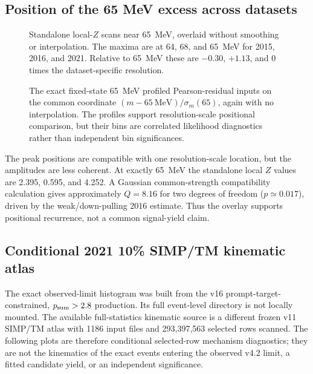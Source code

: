 \subsection{Position of the 65 MeV excess across datasets}
\label{app:m065-positional-overlay}

\begin{figure}[H]
\centering
{}
\caption{Standalone local-$Z$ scans near 65~MeV, overlaid without smoothing
or interpolation.  The maxima are at 64, 68, and 65~MeV for 2015, 2016, and
2021.  Relative to 65~MeV these are $-0.30$, $+1.13$, and $0$ times the
dataset-specific resolution.}
\label{fig:v4p2-m065-z-overlay}
\end{figure}

\begin{figure}[H]
\centering
{}
\caption{The exact fixed-state 65~MeV profiled Pearson-residual inputs on the
common coordinate $(m-65~\mathrm{MeV})/\sigma_m(65)$, again with no
interpolation.  The profiles support resolution-scale positional comparison,
but their bins are correlated likelihood diagnostics rather than independent
bin significances.}
\label{fig:v4p2-m065-residual-overlay}
\end{figure}

The peak positions are compatible with one resolution-scale location, but
the amplitudes are less coherent.  At exactly 65~MeV the standalone local
$Z$ values are 2.395, 0.595, and 4.252.  A Gaussian common-strength
compatibility calculation gives approximately $Q=8.16$ for two degrees of
freedom ($p\simeq0.017$), driven by the weak/down-pulling 2016 estimate.
Thus the overlay supports positional recurrence, not a common signal-yield
claim.

\subsection{Conditional 2021 10\% SIMP/TM kinematic atlas}
\label{app:m065-kinematic-atlas}

The exact observed-limit histogram was built from the v16 prompt-target-
constrained, $p_{\rm sum}>2.8$ production.  Its full event-level directory is
not locally mounted.  The available full-statistics kinematic source is a
different frozen v11 SIMP/TM atlas with 1186 input files and 293,397,563
selected rows scanned.  The following plots are therefore conditional
selected-row mechanism diagnostics; they are not the kinematics of the exact
events entering the observed v4.2 limit, a fitted candidate yield, or an
independent significance.

